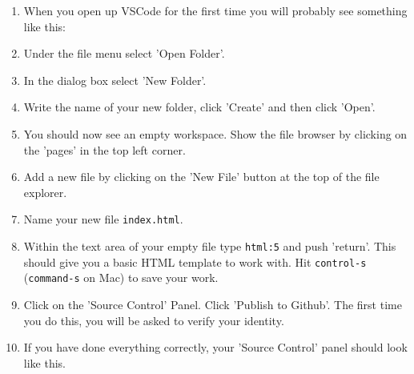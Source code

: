 \documentclass[english,11pt,a4paper]{report}
\begin{document}
\renewcommand{\labelenumi}{\arabic{enumi}.}
\begin{enumerate}
    \item When you open up VSCode for the first time you will probably see something like this:
    \item Under the file menu select 'Open Folder'.
    \item In the dialog box select 'New Folder'.
    \item Write the name of your new folder, click 'Create'  and then click 'Open'.
    \item You should now see an empty workspace. Show the file browser by clicking on the 'pages' in the top left corner. 
    \item Add a new file by clicking on the 'New File' button at the top of the file explorer.
    \newpage
    \item Name your new file \verb|index.html|.
    \item Within the text area of your empty file type \verb|html:5| and push 'return'. This should give you a basic HTML template to work with. Hit \verb|control-s| (\verb|command-s| on Mac) to save your work.
    \newpage
    \item Click on the 'Source Control' Panel. Click 'Publish to Github'. The first time you do this, you will be asked to verify your identity.
    \item If you have done everything correctly, your 'Source Control' panel should look like this.
\end{enumerate}
\end{document}
